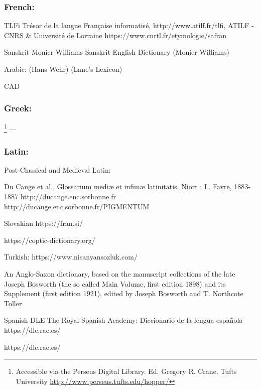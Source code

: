 \noindent \textcite{cresswell_oxford_2021} 

\subsubsection{French:}

TLFi Trésor de la langue Française informatisé, http://www.atilf.fr/tlfi, ATILF - CNRS \& Université de Lorraine
https://www.cnrtl.fr/etymologie/safran

Sanskrit
Monier-Williams Sanskrit-English Dictionary (Monier-Williams)

Arabic:
(Hans-Wehr)
(Lane's Lexicon) 

\gls{CAD}

\subsubsection{Greek:}

\footnote{Accessible via the Perseus Digital Library. Ed. Gregory R. Crane, Tufts University \url{http://www.perseus.tufts.edu/hopper/}} --- \parencite{liddell_greek-english_1940}

\subsubsection{Latin:} 


Post-Classical and Medieval Latin:

Du Cange et al., Glossarium mediæ et infimæ latinitatis. Niort : L. Favre, 1883-1887
http://ducange.enc.sorbonne.fr
http://ducange.enc.sorbonne.fr/PIGMENTUM

Slovakian
https://fran.si/

https://coptic-dictionary.org/

Turkish:
https://www.nisanyansozluk.com/

An Anglo-Saxon dictionary, based on the manuscript collections of the late Joseph Bosworth (the so called Main Volume, first edition 1898) and its Supplement (first edition 1921), edited by Joseph Bosworth and T. Northcote Toller

Spanish
DLE
The Royal Spanish Academy: Diccionario de la lengua española https://dle.rae.es/

https://dle.rae.es/

